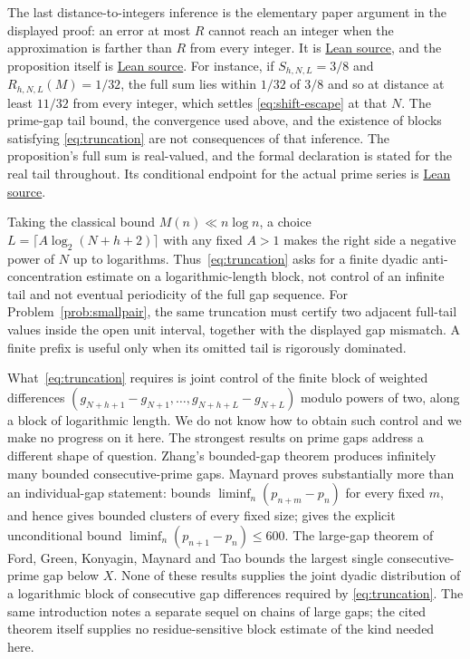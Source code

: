 \documentclass[11pt]{article}
\begin{document}
\noindent The last distance-to-integers inference is the elementary paper
argument in the displayed proof: an error at most $R$ cannot reach an integer
when the approximation is farther than $R$ from every integer.  It is
\href{https://github.com/wcook04/plectis-erdos/blob/f36a98bf3d3e6f65f1074e3b800e3293d5b8a51a/ErdosProblems/Erdos251/PaperTailBoundsR7.lean#L203}{Lean source}, and the proposition itself is
\href{https://github.com/wcook04/plectis-erdos/blob/f36a98bf3d3e6f65f1074e3b800e3293d5b8a51a/ErdosProblems/Erdos251/PaperTailBoundsR7.lean#L261}{Lean source}.  For instance, if
$S_{h,N,L}=3/8$ and $R_{h,N,L}(M)=1/32$, the full sum lies within $1/32$ of
$3/8$ and so at distance at least $11/32$ from every integer, which settles
\eqref{eq:shift-escape} at that $N$.  The prime-gap tail
bound, the convergence used above, and the existence of blocks satisfying
\eqref{eq:truncation} are not consequences of that inference.  The
proposition's full sum is real-valued, and the formal declaration is stated
for the real tail throughout.  Its conditional endpoint for the actual prime
series is \href{https://github.com/wcook04/plectis-erdos/blob/f36a98bf3d3e6f65f1074e3b800e3293d5b8a51a/ErdosProblems/Erdos251/PaperTailBoundsR7.lean#L273}{Lean source}.

\noindent Taking the classical bound $M(n)\ll n\log n$, a choice
$L=\lceil A\log_2(N+h+2)\rceil$ with any fixed $A>1$ makes the right side a
negative power of $N$ up to logarithms.  Thus~\eqref{eq:truncation} asks for a finite
dyadic anti-concentration estimate on a logarithmic-length block, not control
of an infinite tail and not eventual periodicity of the full gap sequence.
For Problem~\ref{prob:smallpair}, the same truncation must certify two adjacent
full-tail values inside the open unit interval, together with the displayed
gap mismatch.  A finite prefix is useful only when its omitted tail is
rigorously dominated.

What~\eqref{eq:truncation} requires is joint control of the finite block of
weighted differences $(g_{N+h+1}-g_{N+1},\ldots,g_{N+h+L}-g_{N+L})$ modulo
powers of two, along a block of logarithmic length.  We do not know how to obtain such control and
we make no progress on it here.  The strongest results on prime gaps address a
different shape of question.  Zhang's bounded-gap theorem
\cite[Theorem~1, p.~1122]{zhang2014} produces infinitely many bounded
consecutive-prime gaps.
Maynard proves substantially more than an individual-gap statement:
\cite[Theorem~1.1, p.~384]{maynard2015} bounds
$\liminf_n(p_{n+m}-p_n)$ for every fixed $m$, and hence gives bounded clusters
of every fixed size; \cite[Theorem~1.3, p.~385]{maynard2015} gives the explicit
unconditional bound $\liminf_n(p_{n+1}-p_n)\le 600$.  The large-gap theorem of
Ford, Green, Konyagin, Maynard and Tao
\cite[Theorem~1, p.~66]{fgkmt2018} bounds the largest single consecutive-prime
gap below $X$.  None of these results supplies the joint dyadic distribution
of a logarithmic block of consecutive gap differences required by
\eqref{eq:truncation}.  The same introduction notes a separate sequel on
chains of large gaps; the cited theorem itself supplies no residue-sensitive
block estimate of the kind needed here.
\end{document}
